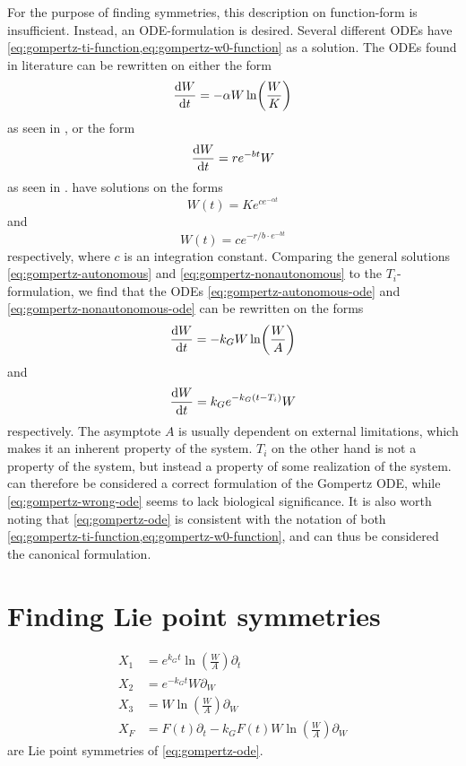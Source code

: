 For the purpose of finding symmetries, this description on function-form is insufficient.
Instead, an ODE-formulation is desired.
Several different ODEs have \cref{eq:gompertz-ti-function,eq:gompertz-w0-function} as a solution.
The ODEs found in literature can be rewritten on either the form
\begin{equation} \label{eq:gompertz-autonomous-ode}
  \dv{W}{t} = -\alpha W \ln(\frac{W}{K})
\end{equation}
as seen in \cite{bajzer1997tumor,delauro2014stochastic}, or the form
\begin{equation} \label{eq:gompertz-nonautonomous-ode}
  \dv{W}{t} = r e^{-b t} W
\end{equation}
as seen in \cite{burger2019epidemic}.
 have solutions on the forms
\begin{equation} \label{eq:gompertz-autonomous}
  W(t) = K e^{c e^{-\alpha t}}
\end{equation}
and
\begin{equation} \label{eq:gompertz-nonautonomous}
  W(t) = c e^{-r/b \cdot e^{-b t}}
\end{equation}
respectively, where \(c\) is an integration constant.
Comparing the general solutions \ref{eq:gompertz-autonomous} and \ref{eq:gompertz-nonautonomous} to the \(T_i\)-formulation, we find that the ODEs \ref{eq:gompertz-autonomous-ode} and \ref{eq:gompertz-nonautonomous-ode} can be rewritten on the forms
\begin{equation} \label{eq:gompertz-ode}
  \dv{W}{t} = -k_G W \ln(\frac{W}{A})
\end{equation}
and
\begin{equation} \label{eq:gompertz-wrong-ode}
  \dv{W}{t} = k_G e^{-k_G (t - T_i)} W
\end{equation}
respectively.
The asymptote \(A\) is usually dependent on external limitations, which makes it an inherent property of the system.
\(T_i\) on the other hand is not a property of the system, but instead a property of some realization of the system.
 can therefore be considered a correct formulation of the Gompertz ODE, while \cref{eq:gompertz-wrong-ode} seems to lack biological significance.
It is also worth noting that \cref{eq:gompertz-ode} is consistent with the notation of both \cref{eq:gompertz-ti-function,eq:gompertz-w0-function}, and can thus be considered the canonical formulation.

\section{Finding Lie point symmetries}
\begin{align}
  X_1 &= e^{k_G t} \ln(\frac{W}{A}) \partial_t \\
  X_2 &= e^{-k_G t} W \partial_W \\
  X_3 &= W \ln(\frac{W}{A}) \partial_W \\
  X_F &= F(t) \partial_t - k_G F(t) W \ln(\frac{W}{A}) \partial_W
\end{align}
are Lie point symmetries of \cref{eq:gompertz-ode}.
